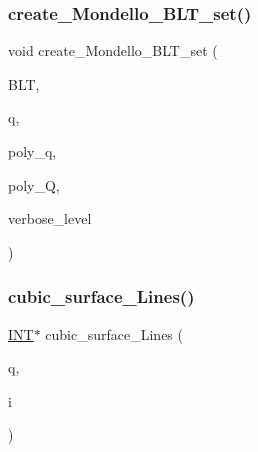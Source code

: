 \subsubsection{\texorpdfstring{create\+\_\+\+Mondello\+\_\+\+B\+L\+T\+\_\+set()}{create\_Mondello\_BLT\_set()}}
{\footnotesize\ttfamily void create\+\_\+\+Mondello\+\_\+\+B\+L\+T\+\_\+set (\begin{DoxyParamCaption}\item[{\mbox{\hyperlink{galois_8h_a09fddde158a3a20bd2dcadb609de11dc}{I\+NT}} $\ast$}]{B\+LT,  }\item[{\mbox{\hyperlink{galois_8h_a09fddde158a3a20bd2dcadb609de11dc}{I\+NT}}}]{q,  }\item[{const \mbox{\hyperlink{galois_8h_ab6cc7b4aeb6ea31aba2b3fbfc83ff5e6}{B\+Y\+TE}} $\ast$}]{poly\+\_\+q,  }\item[{const \mbox{\hyperlink{galois_8h_ab6cc7b4aeb6ea31aba2b3fbfc83ff5e6}{B\+Y\+TE}} $\ast$}]{poly\+\_\+Q,  }\item[{\mbox{\hyperlink{galois_8h_a09fddde158a3a20bd2dcadb609de11dc}{I\+NT}}}]{verbose\+\_\+level }\end{DoxyParamCaption})}

\mbox{\label{data_8_c_a8d69f43132cd2eda7df0fbe97ba4e57c}} 
\subsubsection{\texorpdfstring{cubic\+\_\+surface\+\_\+\+Lines()}{cubic\_surface\_Lines()}}
{\footnotesize\ttfamily \mbox{\hyperlink{galois_8h_a09fddde158a3a20bd2dcadb609de11dc}{I\+NT}}$\ast$ cubic\+\_\+surface\+\_\+\+Lines (\begin{DoxyParamCaption}\item[{\mbox{\hyperlink{galois_8h_a09fddde158a3a20bd2dcadb609de11dc}{I\+NT}}}]{q,  }\item[{\mbox{\hyperlink{galois_8h_a09fddde158a3a20bd2dcadb609de11dc}{I\+NT}}}]{i }\end{DoxyParamCaption})}

\mbox{\label{data_8_c_a01c894aab7a696c8b2853063677c775a}} 

